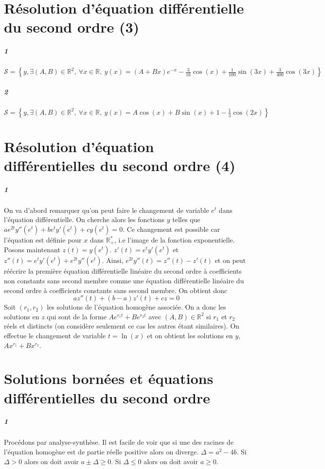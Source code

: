 \documentclass[10pt,a4paper]{article}
\begin{document}
\section{Résolution d'équation différentielle du second ordre (3)}
\subparagraph{1}\(
\mathcal{S} = \left\lbrace y, \exists (A,B) \in \mathbb{R}^2, \ \forall x \in \mathbb{R}, \ y(x) = (A+Bx)e^{-x} -\frac{3}{16} \cos(x) + \frac{1}{100}\sin(3x) + \frac{3}{400} \cos(3x)\right\rbrace
\)
\subparagraph{2}\(
\mathcal{S} = \left\lbrace y, \exists (A,B) \in \mathbb{R}^2, \ \forall x \in \mathbb{R}, \ y(x) = A\cos(x) + B\sin(x) + 1 -\frac{1}{3} \cos(2x)\right\rbrace
\)

\section{Résolution d'équation différentielles du second ordre (4)}
\subparagraph{1}On va  d'abord remarquer qu'on peut faire le changement de variable $e^t$ dans l'équation différentielle. On cherche alors les fonctions $y$ telles que $ae^{2t}y''(e^t) +be^ty'(e^t) +cy(e^t) = 0$. Ce changement est possible car l'équation est définie pour $x$ dans $\mathbb{R}_+^*$, i.e l'image de la fonction exponentielle. Posons maintenant $z(t) = y(e^t)$. $z'(t) = e^ty'(e^t)$ et $z''(t) = e^t y'(e^t) + e^{2t}y''(e^t)$. Ainsi, $e^{2t}y''(t) = z''(t) - z'(t)$ et on peut réécrire la première équation différentielle linéaire du second ordre à coefficients non constants sans second membre comme une équation différentielle linéaire du second ordre à coefficients constants sans second membre. On obtient donc
\[
az''(t) + (b-a)z'(t) +cz= 0
\]
Soit $(r_1,r_2)$ les solutions de l'équation homogène associée. On a donc les solutions en $z$ qui sont de la forme $Ae^{r_1 t} + Be^{r_2 t}$ avec $(A,B) \in \mathbb{R}^2$ si $r_1$ et $r_2$ réels et distincts (on considère seulement ce cas les autres étant similaires). On effectue le changement de variable $t = \ln(x)$ et on obtient les solutions en $y$, $Ax^{r_1} + Bx^{r_2}$.
\section{Solutions bornées et équations différentielles du second ordre}
\subparagraph{1}Procédons par analyse-synthèse. Il est facile de voir que si une des racines de l'équation homogène est de partie réelle positive alors on diverge. $\Delta = a^2 - 4b$. Si $\Delta>0$ alors on doit avoir $a \pm \Delta \ge 0$. Si $\Delta \le 0$ alors on doit avoir $a\ge 0$.
\end{document}
